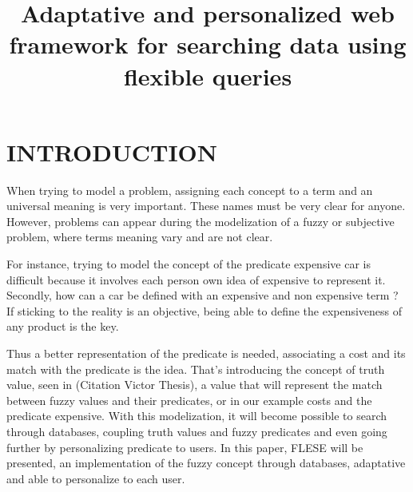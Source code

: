 \documentclass[a4paper,twoside]{article}
\begin{document}
\title{Adaptative and personalized web framework for searching data using flexible queries  \subtitle{} }

\author{
}



\onecolumn \maketitle \normalsize \vfill

\section{\uppercase{Introduction}}
\label{sec:introduction}

When trying to model a problem, assigning each concept to a term and an universal meaning is very important. These names must be very clear for anyone. However, problems can appear during the modelization of a fuzzy or subjective problem, where terms meaning vary and are not clear. 

For instance, trying to model the concept of the predicate expensive car is difficult because it involves each person own idea of expensive to represent it.  Secondly, how can a car be defined with an expensive and non expensive term ? If sticking to the reality is an objective, being able to define the expensiveness of any product is the key.

Thus a better representation of the predicate is needed, associating a cost and its match with the predicate is the idea. That's introducing the concept of truth value, seen in (Citation Victor Thesis), a value that will represent the match between fuzzy values and their predicates, or in our example costs and the predicate expensive. With this modelization, it will become possible to search through databases, coupling truth values and fuzzy predicates and even going further by personalizing predicate to users.
In this paper, FLESE will be presented, an implementation of the fuzzy concept through databases, adaptative and able to personalize to each user.
\end{document}
